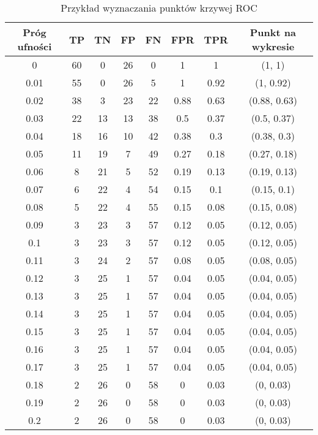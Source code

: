     \begin{table}[H]
        \centering
    \caption{Przykład wyznaczania punktów krzywej ROC}

        \begin{tabular}{|c|c|c|c|c|c|c|c|}
        \hline
        Próg   ufności & TP & TN & FP & FN & FPR  & TPR  & Punkt na   wykresie \\ \hline
        0              & 60 & 0  & 26 & 0  & 1    & 1    & (1, 1)              \\ \hline
        0.01           & 55 & 0  & 26 & 5  & 1    & 0.92 & (1, 0.92)           \\ \hline
        0.02           & 38 & 3  & 23 & 22 & 0.88 & 0.63 & (0.88, 0.63)        \\ \hline
        0.03           & 22 & 13 & 13 & 38 & 0.5  & 0.37 & (0.5, 0.37)         \\ \hline
        0.04           & 18 & 16 & 10 & 42 & 0.38 & 0.3  & (0.38, 0.3)         \\ \hline
        0.05           & 11 & 19 & 7  & 49 & 0.27 & 0.18 & (0.27, 0.18)        \\ \hline
        0.06           & 8  & 21 & 5  & 52 & 0.19 & 0.13 & (0.19, 0.13)        \\ \hline
        0.07           & 6  & 22 & 4  & 54 & 0.15 & 0.1  & (0.15, 0.1)         \\ \hline
        0.08           & 5  & 22 & 4  & 55 & 0.15 & 0.08 & (0.15, 0.08)        \\ \hline
        0.09           & 3  & 23 & 3  & 57 & 0.12 & 0.05 & (0.12, 0.05)        \\ \hline
        0.1            & 3  & 23 & 3  & 57 & 0.12 & 0.05 & (0.12, 0.05)        \\ \hline
        0.11           & 3  & 24 & 2  & 57 & 0.08 & 0.05 & (0.08, 0.05)        \\ \hline
        0.12           & 3  & 25 & 1  & 57 & 0.04 & 0.05 & (0.04, 0.05)        \\ \hline
        0.13           & 3  & 25 & 1  & 57 & 0.04 & 0.05 & (0.04, 0.05)        \\ \hline
        0.14           & 3  & 25 & 1  & 57 & 0.04 & 0.05 & (0.04, 0.05)        \\ \hline
        0.15           & 3  & 25 & 1  & 57 & 0.04 & 0.05 & (0.04, 0.05)        \\ \hline
        0.16           & 3  & 25 & 1  & 57 & 0.04 & 0.05 & (0.04, 0.05)        \\ \hline
        0.17           & 3  & 25 & 1  & 57 & 0.04 & 0.05 & (0.04, 0.05)        \\ \hline
        0.18           & 2  & 26 & 0  & 58 & 0    & 0.03 & (0, 0.03)           \\ \hline
        0.19           & 2  & 26 & 0  & 58 & 0    & 0.03 & (0, 0.03)           \\ \hline
        0.2            & 2  & 26 & 0  & 58 & 0    & 0.03 & (0, 0.03)           \\ \hline
        \end{tabular}
    \label{tab:wyznaczanie_ROC}

        \end{table}